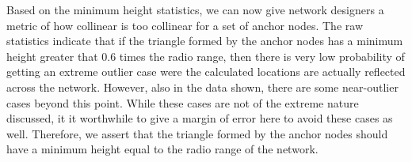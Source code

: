 Based on the minimum height statistics, we can now give network designers a metric of how collinear is too collinear for a set of anchor nodes.  The raw statistics indicate that if the triangle formed by the anchor nodes has a minimum height greater that 0.6 times the radio range, then there is very low probability of getting an extreme outlier case were the calculated locations are actually reflected across the network.  However, also in the data shown, there are some near-outlier cases beyond this point.  While these cases are not of the extreme nature discussed, it it worthwhile to give a margin of error here to avoid these cases as well.  Therefore, we assert that the triangle formed by the anchor nodes should have a minimum height equal to the radio range of the network.
